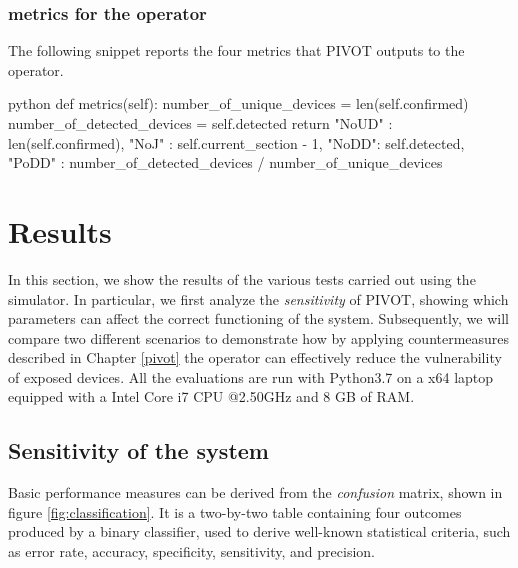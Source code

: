 \vspace{3mm}

\subsubsection{metrics for the operator}
The following snippet reports the four metrics that PIVOT outputs to the operator.
\vspace{3mm}
\begin{mintedbox}{python}
def metrics(self):
    number_of_unique_devices = len(self.confirmed)
    number_of_detected_devices = self.detected
    return {
        "NoUD" : len(self.confirmed),
        "NoJ" : self.current_section - 1,
        "NoDD": self.detected,
        "PoDD" : number_of_detected_devices / number_of_unique_devices
    }
\end{mintedbox}
\vspace{3mm}

\newpage

\section{Results}
\label{results}
In this section, we show the results of the various tests carried out using the simulator. In particular, we first analyze the \textit{sensitivity} of PIVOT, showing which parameters can affect the correct functioning of the system. Subsequently, we will compare two different scenarios to demonstrate how by applying countermeasures described in Chapter \ref{pivot} the operator can effectively reduce the vulnerability of exposed devices. All the evaluations are run with Python3.7 on a x64 laptop equipped with a Intel Core i7 CPU @2.50GHz and 8 GB of RAM.

\subsection{Sensitivity of the system}
Basic performance measures can be derived from the \textit{confusion} matrix, shown in figure \ref{fig:classification}. It is a two-by-two table containing four outcomes produced by a binary classifier, used to derive well-known statistical criteria, such as error rate, accuracy, specificity, sensitivity, and precision.

